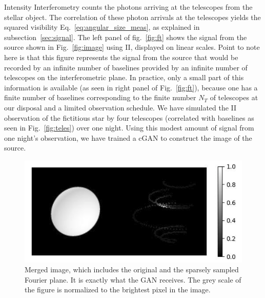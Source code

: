 Intensity Interferometry counts the photons arriving at the telescopes from the stellar object. The correlation of these photon arrivals at the telescopes yields the squared visibility Eq.~\eqref{eq:angular_size_meas}, as explained in subsection~\ref{sec:signal}. The left panel of fig.~\ref{fig:ft} shows the signal from the source shown in Fig.~\ref{fig:image} using II, displayed on linear scales. Point to note here is that this figure represents the signal from the source that would be recorded by an infinite number of baselines provided by an infinite number of telescopes on the interferometric plane. In practice, only a small part of this information is available (as seen in right panel of Fig.~\ref{fig:ft}), because one has a finite number of baselines corresponding to the finite number $N_T$ of telescopes at our disposal and a limited observation schedule. We have simulated the II observation of the fictitious star by four telescopes (correlated with baselines as seen in Fig.~\ref{fig:teles}) over one night. Using this modest amount of signal from one night's observation, we have trained a cGAN to construct the image of the source.
\begin{figure}
  \includegraphics[width=\linewidth]{fig/ellipse1612.png}
  \caption{Merged image, which includes the original and the sparsely sampled Fourier plane. It is exactly what the GAN receives. The grey scale of the figure is normalized to the brightest pixel in the image.}
  \label{fig:GANinput}
\end{figure}
